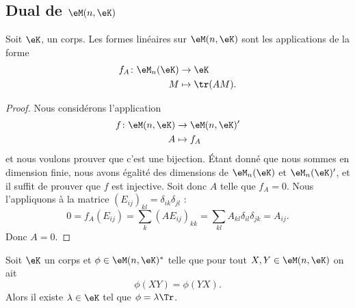 \subsection{Dual de \texorpdfstring{$ \eM(n,\eK)$}{M(n,K)}}

\begin{proposition}     \label{PropHOjJpCa}
    Soit \( \eK\), un corps. Les formes linéaires sur \( \eM(n,\eK)\) sont les applications de la forme
    \begin{equation}
        \begin{aligned}
            f_A\colon \eM_n(\eK)&\to \eK \\
            M&\mapsto \tr(AM). 
        \end{aligned}
    \end{equation}
\end{proposition}


\begin{proof}
    Nous considérons l'application
    \begin{equation}
        \begin{aligned}
            f\colon \eM(n,\eK)&\to \eM(n,\eK)' \\
            A&\mapsto f_A 
        \end{aligned}
    \end{equation}
    et nous voulons prouver que c'est une bijection. Étant donné que nous sommes en dimension finie, nous avons égalité des dimensions de \( \eM_n(\eK)\) et \( \eM_n(\eK)'\), et il suffit de prouver que \( f\) est injective. Soit donc \( A\) telle que \( f_A=0\). Nous l'appliquons à la matrice \( (E_{ij})_{kl}=\delta_{ik}\delta_{jl}\) :
    \begin{equation}
            0=f_A(E_{ij})
            =\sum_{k}(AE_{ij})_{kk}
            =\sum_{kl}A_{kl}\delta_{il}\delta_{jk}
            =A_{ij}.
    \end{equation}
    Donc \( A=0\).
\end{proof}

\begin{corollary}
    Soit \( \eK\) un corps et \( \phi\in\eM(n,\eK)^*\) telle que pour tout \( X,Y\in \eM(n,\eK)\) on ait
    \begin{equation}
        \phi(XY)=\phi(YX).
    \end{equation}
    Alors il existe \( \lambda\in \eK\) tel que \( \phi=\lambda\Tr\).
\end{corollary}

